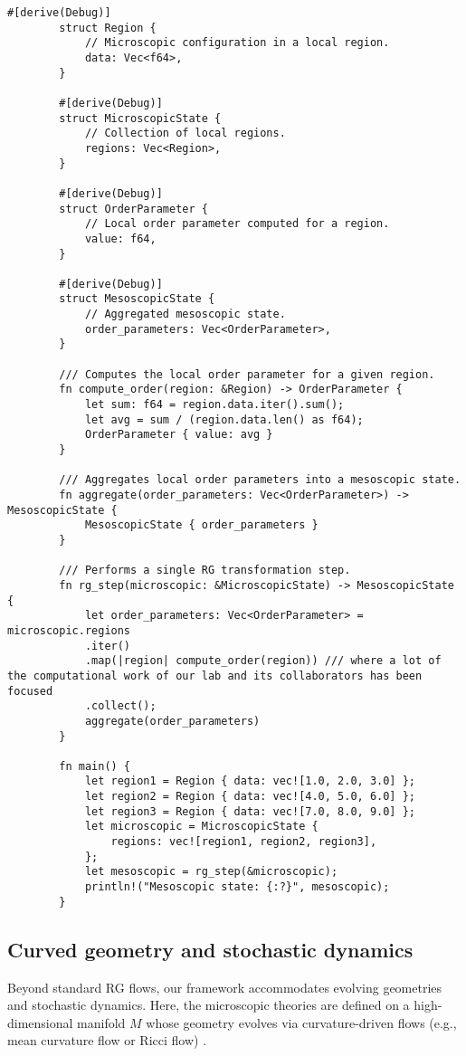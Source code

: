 	\begin{lstlisting}[caption={Rust Implementation of a Single RG Transformation Step}]
		#[derive(Debug)]
		struct Region {
			// Microscopic configuration in a local region.
			data: Vec<f64>,
		}
		
		#[derive(Debug)]
		struct MicroscopicState {
			// Collection of local regions.
			regions: Vec<Region>,
		}
		
		#[derive(Debug)]
		struct OrderParameter {
			// Local order parameter computed for a region.
			value: f64,
		}
		
		#[derive(Debug)]
		struct MesoscopicState {
			// Aggregated mesoscopic state.
			order_parameters: Vec<OrderParameter>,
		}
		
		/// Computes the local order parameter for a given region.
		fn compute_order(region: &Region) -> OrderParameter {
			let sum: f64 = region.data.iter().sum();
			let avg = sum / (region.data.len() as f64);
			OrderParameter { value: avg }
		}
		
		/// Aggregates local order parameters into a mesoscopic state.
		fn aggregate(order_parameters: Vec<OrderParameter>) -> MesoscopicState {
			MesoscopicState { order_parameters }
		}
		
		/// Performs a single RG transformation step.
		fn rg_step(microscopic: &MicroscopicState) -> MesoscopicState {
			let order_parameters: Vec<OrderParameter> = microscopic.regions
			.iter()
			.map(|region| compute_order(region)) /// where a lot of the computational work of our lab and its collaborators has been focused
			.collect();
			aggregate(order_parameters)
		}
		
		fn main() {
			let region1 = Region { data: vec![1.0, 2.0, 3.0] };
			let region2 = Region { data: vec![4.0, 5.0, 6.0] };
			let region3 = Region { data: vec![7.0, 8.0, 9.0] };
			let microscopic = MicroscopicState {
				regions: vec![region1, region2, region3],
			};
			let mesoscopic = rg_step(&microscopic);
			println!("Mesoscopic state: {:?}", mesoscopic);
		}
	\end{lstlisting}
	
	\subsection{Curved geometry and stochastic dynamics}
		Beyond standard RG flows, our framework accommodates evolving geometries and stochastic dynamics. Here, the microscopic theories are defined on a high-dimensional manifold \(M\) whose geometry evolves via curvature-driven flows (e.g., mean curvature flow or Ricci flow) \cite{hamilton1982three, grayson1987shortening}. 
	
